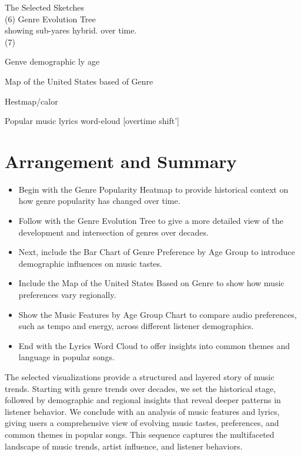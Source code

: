 \documentclass[12pt]{article}
\begin{document}
The Selected Sketches\\
(6) Genre Evolution Tree\\
showing sub-yares hybrid. over time.\\
(7)\\

Genve demographic ly age\\

Map of the United States based of Genre\\

Hestmap/calor

Popular music lyrics word-eloud [overtime shift']\\

\section*{Arrangement and Summary}
\begin{itemize}
  \item Begin with the Genre Popularity Heatmap to provide historical context on how genre popularity has changed over time.
  \item Follow with the Genre Evolution Tree to give a more detailed view of the development and intersection of genres over decades.
  \item Next, include the Bar Chart of Genre Preference by Age Group to introduce demographic influences on music tastes.
  \item Include the Map of the United States Based on Genre to show how music preferences vary regionally.
  \item Show the Music Features by Age Group Chart to compare audio preferences, such as tempo and energy, across different listener demographics.
  \item End with the Lyrics Word Cloud to offer insights into common themes and language in popular songs.
\end{itemize}

The selected visualizations provide a structured and layered story of music trends. Starting with genre trends over decades, we set the historical stage, followed by demographic and regional insights that reveal deeper patterns in listener behavior. We conclude with an analysis of music features and lyrics, giving users a comprehensive view of evolving music tastes, preferences, and common themes in popular songs. This sequence captures the multifaceted landscape of music trends, artist influence, and listener behaviors.
\end{document}
